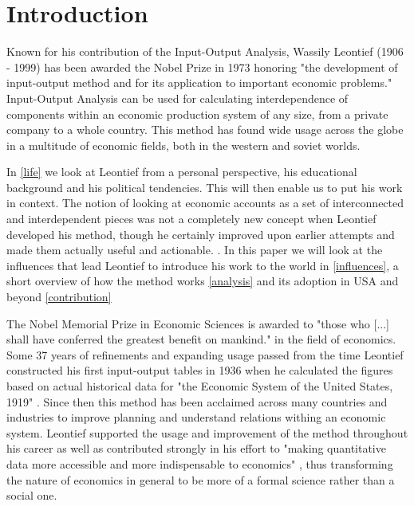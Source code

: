 
\section{Introduction} \label{introduction}


Known for his contribution of the Input-Output Analysis, Wassily Leontief (1906 - 1999) has been awarded the Nobel Prize in 1973 honoring "the development of input-output method and for its application to important economic problems." Input-Output Analysis can be used for calculating interdependence of components within an economic production system of any size, from a private company to a whole country. This method has found wide usage across the globe in a multitude of economic fields, both in the western and soviet worlds.

In \ref{life} we look at Leontief from a personal perspective, his educational background and his political tendencies. This will then enable us to put his work in context. The notion of looking at economic accounts as a set of interconnected and interdependent pieces was not a completely new concept when Leontief developed his method, though he certainly improved upon earlier attempts and made them actually useful and actionable. \cite[p.~512]{Baumol2009}. In this paper we will look at the influences that lead Leontief to introduce his work to the world in \ref{influences}, a short overview of how the method works \ref{analysis} and its adoption in USA and beyond \ref{contribution}

The Nobel Memorial Prize in Economic Sciences is awarded to "those who [...] shall have conferred the greatest benefit on mankind." \cite[]{Nobel} in the field of economics. Some 37 years of refinements and expanding usage passed from the time Leontief constructed his first input-output tables in 1936 when he calculated the figures based on actual historical data for "the Economic System of the United States, 1919" \cite[]{kohli2003leontief}. Since then this method has been acclaimed across many countries and industries to improve planning and understand relations withing an economic system. Leontief supported the usage and improvement of the method throughout his career as well as contributed strongly in his effort to "making quantitative data more accessible and more indispensable to economics" \cite[p.75]{dymond2015recent} , thus transforming the nature of economics in general to be more of a formal science rather than a social one.
